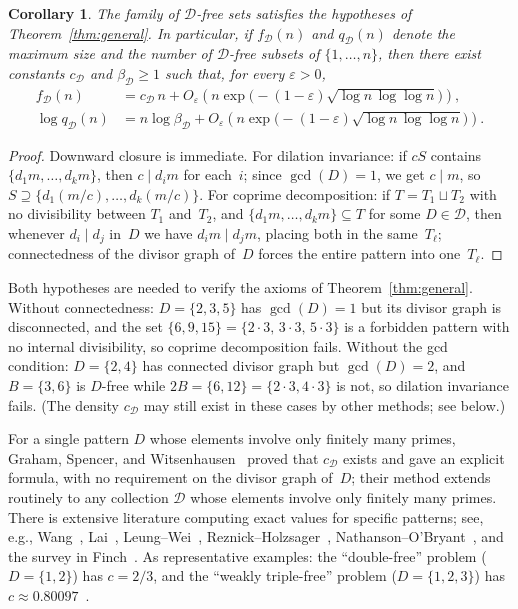\documentclass[11pt]{amsart}
\newtheorem{corollary}[theorem]{Corollary}
\begin{document}
\begin{corollary}\label{cor:ratio}
The family of \(\mathcal{D}\)-free sets satisfies the hypotheses of Theorem~\ref{thm:general}. In particular, if \(f_{\mathcal{D}}(n)\) and \(q_{\mathcal{D}}(n)\) denote the maximum size and the number of \(\mathcal{D}\)-free subsets of \(\{1,\dots,n\}\), then there exist constants \(c_{\mathcal{D}}\) and \(\beta_{\mathcal{D}}\ge 1\) such that, for every \(\varepsilon>0\),
\begin{align*}
f_{\mathcal{D}}(n)&=c_{\mathcal{D}}\,n+O_{\varepsilon}\!\left(n\exp\!\bigl(-(1-\varepsilon)\sqrt{\log n\,\log\log n}\bigr)\right),\\
\log q_{\mathcal{D}}(n)&=n\log\beta_{\mathcal{D}}+O_{\varepsilon}\!\left(n\exp\!\bigl(-(1-\varepsilon)\sqrt{\log n\,\log\log n}\bigr)\right).
\end{align*}
\end{corollary}

\begin{proof}
Downward closure is immediate.
For dilation invariance: if \(cS\) contains \(\{d_1 m,\dots,d_k m\}\),
then \(c\mid d_i m\) for each~\(i\); since \(\gcd(D)=1\),
we get \(c\mid m\), so \(S\supseteq\{d_1(m/c),\dots,d_k(m/c)\}\).
For coprime decomposition: if \(T=T_1\sqcup T_2\)
with no divisibility between \(T_1\) and~\(T_2\), and
\(\{d_1 m,\dots,d_k m\}\subseteq T\) for some
\(D\in\mathcal{D}\), then whenever \(d_i\mid d_j\) in~\(D\)
we have \(d_i m\mid d_j m\), placing both in the same~\(T_\ell\);
connectedness of the divisor graph of~\(D\) forces the entire
pattern into one~\(T_\ell\).
\end{proof}

Both hypotheses are needed to verify the axioms of Theorem~\ref{thm:general}. Without connectedness: \(D=\{2,3,5\}\) has \(\gcd(D)=1\) but its divisor graph is disconnected, and the set \(\{6,9,15\}=\{2\cdot 3,\,3\cdot 3,\,5\cdot 3\}\) is a forbidden pattern with no internal divisibility, so coprime decomposition fails. Without the gcd condition: \(D=\{2,4\}\) has connected divisor graph but \(\gcd(D)=2\), and \(B=\{3,6\}\) is \(D\)-free while \(2B=\{6,12\}=\{2\cdot 3,4\cdot 3\}\) is not, so dilation invariance fails. (The density \(c_{\mathcal{D}}\) may still exist in these cases by other methods; see below.)

For a single pattern \(D\) whose elements involve only finitely many primes, Graham, Spencer, and Witsenhausen~\cite{GSW77} proved that \(c_{\mathcal{D}}\) exists and gave an explicit formula, with no requirement on the divisor graph of~\(D\); their method extends routinely to any collection \(\mathcal{D}\) whose elements involve only finitely many primes. There is extensive literature computing exact values for specific patterns; see, e.g., Wang~\cite{Wang89}, Lai~\cite{Lai92}, Leung--Wei~\cite{LW94}, Reznick--Holzsager~\cite{RH95}, Nathanson--O'Bryant~\cite{NO13}, and the survey in Finch~\cite[\S2.26]{Finch03}. As representative examples: the ``double-free'' problem (\(D=\{1,2\}\)) has \(c=2/3\), and the ``weakly triple-free'' problem (\(D=\{1,2,3\}\)) has \(c\approx 0.80097\)~\cite{GSW77,BloomEP168}.
\end{document}
